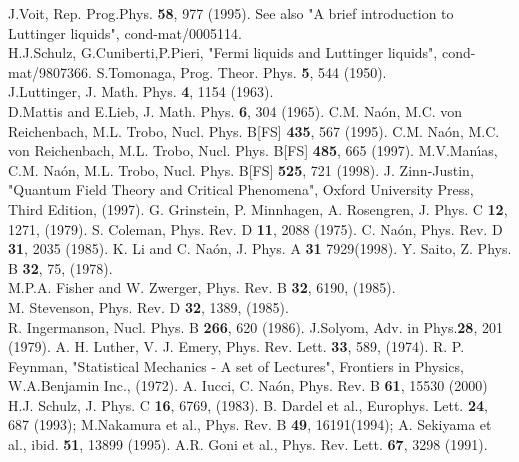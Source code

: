 \documentclass[a4paper,a4paper]{article}
\begin{document}
\newpage
\begin{thebibliography}{99}
 J.Voit, Rep. Prog.Phys. {\bf58}, 977 (1995). See also "A brief
introduction to Luttinger liquids", cond-mat/0005114.\\ H.J.Schulz,
G.Cuniberti,P.Pieri, "Fermi liquids and Luttinger liquids", cond-mat/9807366.
 S.Tomonaga, Prog. Theor. Phys. {\bf5}, 544 (1950).\\
 J.Luttinger, J. Math. Phys. {\bf4}, 1154 (1963).\\
 D.Mattis and E.Lieb, J. Math. Phys. {\bf6}, 304 (1965).
 C.M. Na\'on, M.C. von Reichenbach, M.L. Trobo, Nucl. Phys.
B[FS] {\bf435}, 567 (1995).
C.M. Na\'on, M.C. von Reichenbach, M.L. Trobo, Nucl. Phys.
B[FS] {\bf485}, 665 (1997).
 M.V.Man\'{\i}as, C.M. Na\'on, M.L. Trobo, Nucl. Phys.
B[FS] {\bf525}, 721 (1998).
 J. Zinn-Justin, "Quantum Field Theory and Critical Phenomena",
Oxford University Press, Third Edition, (1997).
 G. Grinstein, P. Minnhagen, A. Rosengren, J. Phys. C {\bf 12}, 1271,
(1979).
 S. Coleman, Phys. Rev. D {\bf11}, 2088 (1975).
 C. Na\'on, Phys. Rev. D {\bf31}, 2035
(1985).
 K. Li and C. Na\'on, J. Phys. A {\bf 31} 7929(1998).
 Y. Saito, Z. Phys. B {\bf 32}, 75, (1978).\\ M.P.A. Fisher and W. Zwerger,
Phys. Rev. B {\bf 32}, 6190, (1985).\\ M. Stevenson, Phys. Rev. D {\bf 32}, 1389,
(1985).\\ R. Ingermanson, Nucl. Phys. B {\bf 266}, 620 (1986).
 J.Solyom, Adv. in Phys.{\bf28}, 201 (1979).
 A. H. Luther, V. J. Emery, Phys. Rev. Lett. {\bf 33}, 589,
(1974).
 R. P. Feynman, "Statistical Mechanics - A set of Lectures",
Frontiers in Physics, W.A.Benjamin Inc., (1972).
 A. Iucci, C. Na\'on, Phys. Rev. B {\bf 61}, 15530 (2000)
 H.J. Schulz, J. Phys. C {\bf 16}, 6769, (1983).
 B. Dardel et al., Europhys. Lett. {\bf 24},
687 (1993); M.Nakamura et al., Phys. Rev. B {\bf 49}, 16191(1994); A. Sekiyama et al.,
ibid. {\bf 51}, 13899 (1995).
 A.R. Goni et al., Phys. Rev. Lett. {\bf67},
3298 (1991).


\end{thebibliography}
\end{document}
